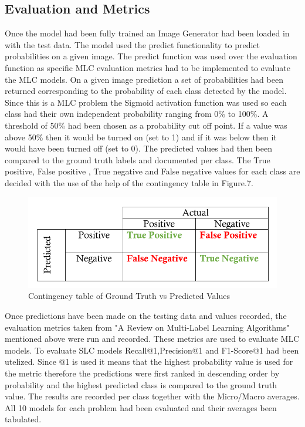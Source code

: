 \documentclass{csfyp}
\begin{document}
\subsection{Evaluation and Metrics}
Once the model had been fully trained an Image Generator had been loaded in with the test data. The model used the predict functionality to predict probabilities on a given image. The predict function was used over the evaluation function as specific MLC evaluation metrics had to be implemented to evaluate the MLC models. On a given image prediction a set of probabilities had been returned corresponding to the probability of each class detected by the model. Since this is a MLC problem the Sigmoid activation function was used so each class had their own independent probability ranging from 0\% to 100\%. A threshold of 50\% had been chosen as a probability cut off point. If a value was above 50\% then it would be turned on (set to 1) and if it was below then it would have been turned off (set to 0). The predicted values had then been compared to the ground truth labels and documented per class. The True positive, False positive , True negative and False negative values for each class are decided with the use of the help of the contingency table in Figure.7.

\begin{figure}[!htbp]
\centering
\includegraphics[scale=0.35]{TPFP.pdf}
\caption{Contingency table of Ground Truth vs Predicted Values }
\end{figure}

Once predictions have been made on the testing data and values recorded, the evaluation metrics taken from "A Review on Multi-Label Learning Algorithms" mentioned above were run and recorded. These metrics are used to evaluate MLC models. To evaluate SLC models Recall@1,Precision@1 and F1-Score@1 had been utelized. Since @1 is used it means that the highest probability value is used for the metric therefore the predictions were first ranked in descending order by probability and the highest predicted class is compared to the ground truth value. The results are recorded per class together with the Micro/Macro averages. All 10 models for each problem had been evaluated and their averages been tabulated.
\end{document}
